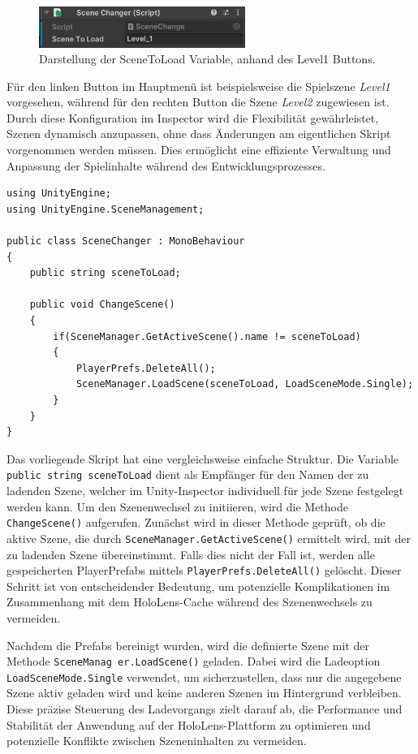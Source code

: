 \begin{figure}[H]
    \centering
    \includegraphics[width=0.6\textwidth]{images/sceneToLoad.png}
    \caption{Darstellung der SceneToLoad Variable, anhand des Level1 Buttons.}
    \label{fig:scenetoload}
\end{figure}

Für den linken Button im Hauptmenü ist beispielsweise die Spielszene \textit{Level1} vorgesehen, während für den rechten
Button die Szene \textit{Level2} zugewiesen ist. Durch diese Konfiguration im Inspector wird die Flexibilität gewährleistet,
Szenen dynamisch anzupassen, ohne dass Änderungen am eigentlichen Skript vorgenommen werden müssen. Dies ermöglicht eine
effiziente Verwaltung und Anpassung der Spielinhalte während des Entwicklungsprozesses.

\begin{lstlisting}[style=csharp, caption=Auf Knopfdruck Szene wechseln., label=code:scenechange]
using UnityEngine;
using UnityEngine.SceneManagement;

public class SceneChanger : MonoBehaviour
{
    public string sceneToLoad;

    public void ChangeScene()
    {
        if(SceneManager.GetActiveScene().name != sceneToLoad)
        {
            PlayerPrefs.DeleteAll();
            SceneManager.LoadScene(sceneToLoad, LoadSceneMode.Single);
        }
    }
}
\end{lstlisting}

Das vorliegende Skript hat eine vergleichsweise einfache Struktur. Die Variable \texttt{public string sceneToLoad} dient als Empfänger für den Namen der zu ladenden Szene, welcher im Unity-Inspector individuell für jede Szene festgelegt werden kann. Um den Szenenwechsel zu initiieren, wird die Methode \texttt{ChangeScene()} aufgerufen. Zunächst wird in dieser Methode geprüft, ob die aktive Szene, die durch \texttt{SceneManager.GetActiveScene()} ermittelt wird, mit der zu ladenden Szene übereinstimmt. Falls dies nicht der Fall ist, werden alle gespeicherten PlayerPrefabs mittels \texttt{PlayerPrefs.DeleteAll()} gelöscht. Dieser Schritt ist von entscheidender Bedeutung, um potenzielle Komplikationen im Zusammenhang mit dem HoloLens-Cache während des Szenenwechsels zu vermeiden.

Nachdem die Prefabs bereinigt wurden, wird die definierte Szene mit der Methode \texttt{SceneManag er.LoadScene()} geladen. Dabei wird die Ladeoption \texttt{LoadSceneMode.Single} verwendet, um sicherzustellen, dass nur die angegebene Szene aktiv geladen wird und keine anderen Szenen im Hintergrund verbleiben. Diese präzise Steuerung des Ladevorgangs zielt darauf ab, die Performance und Stabilität der Anwendung auf der HoloLens-Plattform zu optimieren und potenzielle Konflikte zwischen Szeneninhalten zu vermeiden.

